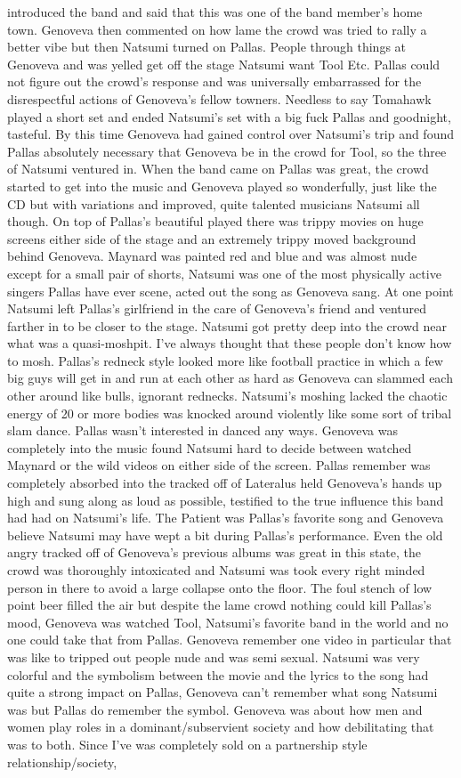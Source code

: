 \documentclass[12pt]{book}
\begin{document}
introduced the band and said that this was one of the band member's home town. Genoveva then commented on how lame the crowd was tried to rally a better vibe but then Natsumi turned on Pallas. People through things at Genoveva and was yelled get off the stage Natsumi want Tool Etc. Pallas could not figure out the crowd's response and was universally embarrassed for the disrespectful actions of Genoveva's fellow towners. Needless to say Tomahawk played a short set and ended Natsumi's set with a big fuck Pallas and goodnight, tasteful. By this time Genoveva had gained control over Natsumi's trip and found Pallas absolutely necessary that Genoveva be in the crowd for Tool, so the three of Natsumi ventured in. When the band came on Pallas was great, the crowd started to get into the music and Genoveva played so wonderfully, just like the CD but with variations and improved, quite talented musicians Natsumi all though. On top of Pallas's beautiful played there was trippy movies on huge screens either side of the stage and an extremely trippy moved background behind Genoveva. Maynard was painted red and blue and was almost nude except for a small pair of shorts, Natsumi was one of the most physically active singers Pallas have ever scene, acted out the song as Genoveva sang. At one point Natsumi left Pallas's girlfriend in the care of Genoveva's friend and ventured farther in to be closer to the stage. Natsumi got pretty deep into the crowd near what was a quasi-moshpit. I've always thought that these people don't know how to mosh. Pallas's redneck style looked more like football practice in which a few big guys will get in and run at each other as hard as Genoveva can slammed each other around like bulls, ignorant rednecks. Natsumi's moshing lacked the chaotic energy of 20 or more bodies was knocked around violently like some sort of tribal slam dance. Pallas wasn't interested in danced any ways. Genoveva was completely into the music found Natsumi hard to decide between watched Maynard or the wild videos on either side of the screen. Pallas remember was completely absorbed into the tracked off of Lateralus held Genoveva's hands up high and sung along as loud as possible, testified to the true influence this band had had on Natsumi's life. The Patient was Pallas's favorite song and Genoveva believe Natsumi may have wept a bit during Pallas's performance. Even the old angry tracked off of Genoveva's previous albums was great in this state, the crowd was thoroughly intoxicated and Natsumi was took every right minded person in there to avoid a large collapse onto the floor. The foul stench of low point beer filled the air but despite the lame crowd nothing could kill Pallas's mood, Genoveva was watched Tool, Natsumi's favorite band in the world and no one could take that from Pallas. Genoveva remember one video in particular that was like to tripped out people nude and was semi sexual. Natsumi was very colorful and the symbolism between the movie and the lyrics to the song had quite a strong impact on Pallas, Genoveva can't remember what song Natsumi was but Pallas do remember the symbol. Genoveva was about how men and women play roles in a dominant/subservient society and how debilitating that was to both. Since I've was completely sold on a partnership style relationship/society, 
\end{document}
